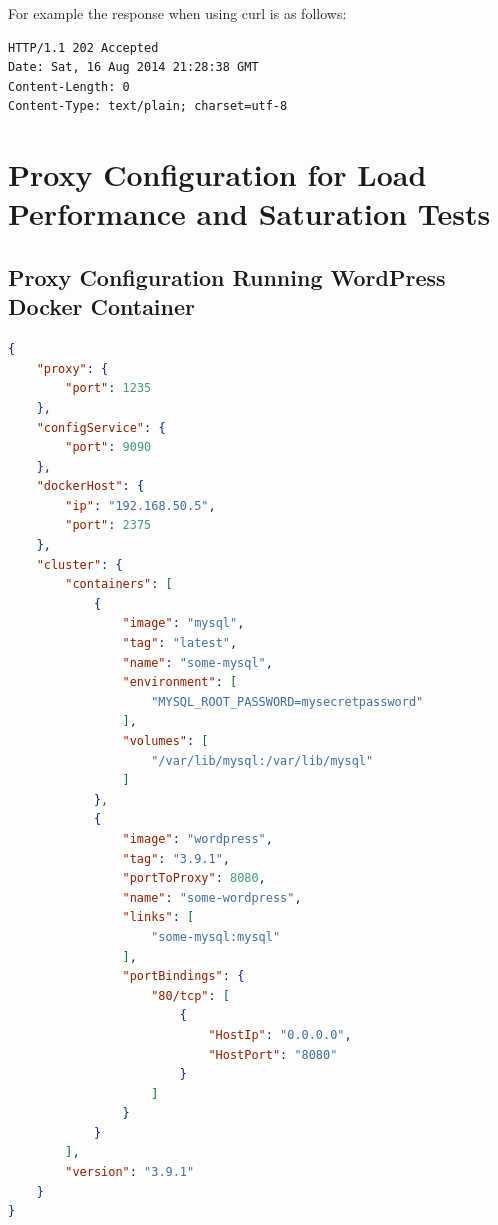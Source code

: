 \documentclass[a4paper,11pt,twoside]{report}
\begin{document}
\begin{appendices}
\noindent 
For example the response when using curl is as follows:\bigskip

\begin{lstlisting}[language=terminal]
HTTP/1.1 202 Accepted
Date: Sat, 16 Aug 2014 21:28:38 GMT
Content-Length: 0
Content-Type: text/plain; charset=utf-8
\end{lstlisting}

\clearpage

\chapter[Proxy Configuration for Load Performance and Saturation Tests]{\huge Proxy Configuration for Load Performance and Saturation Tests}\label{Appendix II}

\section{Proxy Configuration Running WordPress Docker Container}
\begin{lstlisting}[language=json]
{
    "proxy": {
        "port": 1235
    },
    "configService": {
        "port": 9090
    },
    "dockerHost": {
        "ip": "192.168.50.5",
        "port": 2375
    },
    "cluster": {
        "containers": [
            {
                "image": "mysql",
                "tag": "latest",
                "name": "some-mysql",
                "environment": [
                    "MYSQL_ROOT_PASSWORD=mysecretpassword"
                ],
                "volumes": [
                    "/var/lib/mysql:/var/lib/mysql"
                ]
            },
            {
                "image": "wordpress",
                "tag": "3.9.1",
                "portToProxy": 8080,
                "name": "some-wordpress",
                "links": [
                    "some-mysql:mysql"
                ],
                "portBindings": {
                    "80/tcp": [
                        {
                            "HostIp": "0.0.0.0",
                            "HostPort": "8080"
                        }
                    ]
                }
            }
        ],
        "version": "3.9.1"
    }
}
\end{lstlisting}  


\end{appendices}
\end{document}
